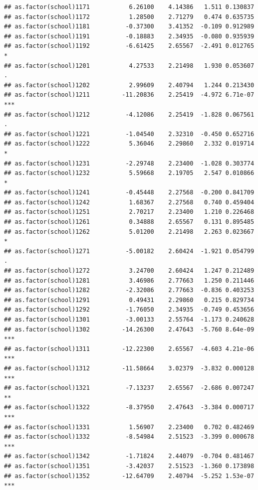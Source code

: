 \documentclass[ignorenonframetext,]{beamer}
\begin{document}
\begin{frame}[fragile]{}
\begin{verbatim}
## as.factor(school)1171           6.26100    4.14386   1.511 0.130837    
## as.factor(school)1172           1.28500    2.71279   0.474 0.635735    
## as.factor(school)1181          -0.37300    3.41352  -0.109 0.912989    
## as.factor(school)1191          -0.18883    2.34935  -0.080 0.935939    
## as.factor(school)1192          -6.61425    2.65567  -2.491 0.012765 *  
## as.factor(school)1201           4.27533    2.21498   1.930 0.053607 .  
## as.factor(school)1202           2.99609    2.40794   1.244 0.213430    
## as.factor(school)1211         -11.20836    2.25419  -4.972 6.71e-07 ***
## as.factor(school)1212          -4.12086    2.25419  -1.828 0.067561 .  
## as.factor(school)1221          -1.04540    2.32310  -0.450 0.652716    
## as.factor(school)1222           5.36046    2.29860   2.332 0.019714 *  
## as.factor(school)1231          -2.29748    2.23400  -1.028 0.303774    
## as.factor(school)1232           5.59668    2.19705   2.547 0.010866 *  
## as.factor(school)1241          -0.45448    2.27568  -0.200 0.841709    
## as.factor(school)1242           1.68367    2.27568   0.740 0.459404    
## as.factor(school)1251           2.70217    2.23400   1.210 0.226468    
## as.factor(school)1261           0.34888    2.65567   0.131 0.895485    
## as.factor(school)1262           5.01200    2.21498   2.263 0.023667 *  
## as.factor(school)1271          -5.00182    2.60424  -1.921 0.054799 .  
## as.factor(school)1272           3.24700    2.60424   1.247 0.212489    
## as.factor(school)1281           3.46986    2.77663   1.250 0.211446    
## as.factor(school)1282          -2.32086    2.77663  -0.836 0.403253    
## as.factor(school)1291           0.49431    2.29860   0.215 0.829734    
## as.factor(school)1292          -1.76050    2.34935  -0.749 0.453656    
## as.factor(school)1301          -3.00133    2.55764  -1.173 0.240628    
## as.factor(school)1302         -14.26300    2.47643  -5.760 8.64e-09 ***
## as.factor(school)1311         -12.22300    2.65567  -4.603 4.21e-06 ***
## as.factor(school)1312         -11.58664    3.02379  -3.832 0.000128 ***
## as.factor(school)1321          -7.13237    2.65567  -2.686 0.007247 ** 
## as.factor(school)1322          -8.37950    2.47643  -3.384 0.000717 ***
## as.factor(school)1331           1.56907    2.23400   0.702 0.482469    
## as.factor(school)1332          -8.54984    2.51523  -3.399 0.000678 ***
## as.factor(school)1342          -1.71824    2.44079  -0.704 0.481467    
## as.factor(school)1351          -3.42037    2.51523  -1.360 0.173898    
## as.factor(school)1352         -12.64709    2.40794  -5.252 1.53e-07 ***

\end{verbatim}
\end{frame}
\end{document}

